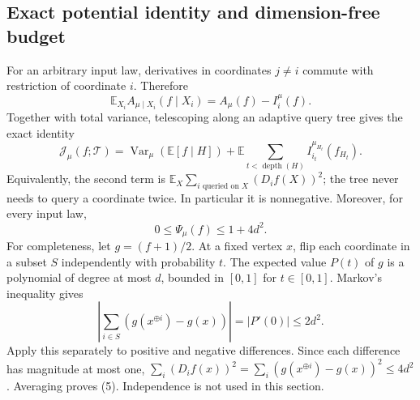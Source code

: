 \subsection{Exact potential identity and dimension-free
budget}\label{influence-recovery:exact-potential-identity-and-dimension-free-budget}

For an arbitrary input law, derivatives in coordinates \(j\ne i\)
commute with restriction of coordinate \(i\). Therefore \[
 \mathbb E_{X_i} A_{\mu\mid X_i}(f\mid X_i)
 =A_\mu(f)-I_i^\mu(f).                                   \tag{3}
\] Together with total variance, telescoping along an adaptive query
tree gives the exact identity \[
 \mathcal J_\mu(f;\mathcal T)
 =\operatorname{Var}_\mu(\mathbb E[f\mid H])
  +\mathbb E\sum_{t<\operatorname{depth}(H)}
       I_{i_t}^{\mu_{H_t}}(f_{H_t}).                       \tag{4}
\] Equivalently, the second term is
\(\mathbb E_X\sum_{i\text{ queried on }X}(D_i f(X))^2\); the tree never
needs to query a coordinate twice. In particular it is nonnegative.
Moreover, for every input law, \[
 0\le\Psi_\mu(f)\le1+4d^2.                               \tag{5}
\] For completeness, let \(g=(f+1)/2\). At a fixed vertex \(x\), flip
each coordinate in a subset \(S\) independently with probability \(t\).
The expected value \(P(t)\) of \(g\) is a polynomial of degree at most
\(d\), bounded in \([0,1]\) for \(t\in[0,1]\). Markov's inequality gives
\[
 \left|\sum_{i\in S}(g(x^{\oplus i})-g(x))\right|
 =|P'(0)|\le2d^2.
\] Apply this separately to positive and negative differences. Since
each difference has magnitude at most one,
\(\sum_i(D_i f(x))^2=\sum_i(g(x^{\oplus i})-g(x))^2\le4d^2\). Averaging
proves (5). Independence is not used in this section.
